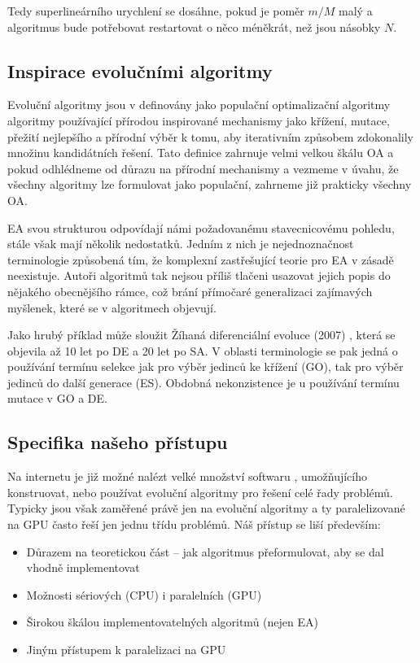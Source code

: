 Tedy superlineárního urychlení se dosáhne, pokud je poměr $m/M$ malý a algoritmus bude potřebovat restartovat o něco méněkrát, než jsou násobky $N$. 

\subsection{Inspirace evolučními algoritmy}
Evoluční algoritmy jsou v \cite{GO ebook} definovány jako \bq populační optimalizační algoritmy algoritmy používající přírodou inspirované mechanismy jako křížení, mutace, přežití nejlepšího a přírodní výběr k tomu, aby iterativním způsobem zdokonalily množinu kandidátních řešení\eq. Tato definice zahrnuje velmi velkou škálu OA a pokud odhlédneme od důrazu na přírodní mechanismy a vezmeme v úvahu, že všechny algoritmy lze formulovat jako populační, zahrneme již prakticky všechny OA.

EA svou strukturou odpovídají námi požadovanému stavecnicovému pohledu, stále však mají několik nedostatků. Jedním z nich je nejednoznačnost terminologie způsobená tím, že komplexní zastřešující teorie pro EA v zásadě neexistuje. Autoři algoritmů tak nejsou příliš tlačeni usazovat jejich popis do nějakého obecnějšího rámce, což brání přímočaré generalizaci zajímavých myšlenek, které se v algoritmech objevují.

Jako hrubý příklad může sloužit Žíhaná diferenciální evoluce (2007) \cite{DE annealed}, která se objevila až 10 let po DE a 20 let po SA. V oblasti terminologie se pak jedná o používání termínu selekce jak pro výběr jedinců ke křížení (GO), tak pro výběr jedinců do další generace (ES). Obdobná nekonzistence je u používání termínu mutace v GO a DE.

\subsection{Specifika našeho přístupu} 
Na internetu je již možné nalézt velké množství softwaru \cite{Evolving Objects}, \cite{PUGACE} umožňujícího konstruovat, nebo používat evoluční algoritmy pro řešení celé řady problémů. Typicky jsou však zaměřené právě jen na evoluční algoritmy a ty paralelizované na GPU často řeší jen jednu třídu problémů. Náš přístup se liší především:
\begin{itemize}
  \item Důrazem na teoretickou část -- jak algoritmus přeformulovat, aby se dal vhodně implementovat
  \item Možnosti sériových (CPU) i paralelních (GPU)
  \item Širokou škálou implementovatelných algoritmů (nejen EA)
  \item Jiným přístupem k paralelizaci na GPU 
\end{itemize}

